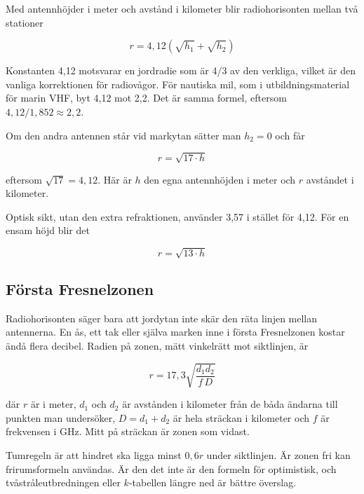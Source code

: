 Med antennhöjder i meter och avstånd i kilometer blir radiohorisonten
mellan två stationer

\begin{equation}
	r = 4,12 \left(\sqrt{h_1}+\sqrt{h_2}\right)
\end{equation}

Konstanten 4,12 motsvarar en jordradie som är 4/3 av den verkliga, vilket
är den vanliga korrektionen för radiovågor. För nautiska mil, som i
utbildningsmaterial för marin VHF, byt 4,12 mot 2,2. Det är samma formel,
eftersom $4,12 / 1,852 \approx 2,2$.

Om den andra antennen står vid markytan sätter man $h_2 = 0$ och får

\begin{equation}
	r = \sqrt{17 \cdot h}
\end{equation}

eftersom $\sqrt{17} = 4,12$. Här är $h$ den egna antennhöjden i meter och
$r$ avståndet i kilometer.

Optisk sikt, utan den extra refraktionen, använder 3,57 i stället för
4,12. För en ensam höjd blir det

\begin{equation}
	r = \sqrt{13 \cdot h}
\end{equation}


\subsection{Första Fresnelzonen}

Radiohorisonten säger bara att jordytan inte skär den räta linjen mellan
antennerna. En ås, ett tak eller själva marken inne i första Fresnelzonen
kostar ändå flera decibel. Radien på zonen, mätt vinkelrätt mot
siktlinjen, är

\begin{equation}
	r = 17,3 \sqrt{\frac{d_1 d_2}{f\,D}}
\end{equation}

där $r$ är i meter, $d_1$ och $d_2$ är avstånden i kilometer från de båda
ändarna till punkten man undersöker, $D = d_1 + d_2$ är hela sträckan i
kilometer och $f$ är frekvensen i GHz. Mitt på sträckan är zonen som
vidast.

Tumregeln är att hindret ska ligga minst $0,6r$ under siktlinjen. Är
zonen fri kan frirumsformeln användas. Är den det inte är den formeln för
optimistisk, och tvåstråleutbredningen eller $k$-tabellen längre ned är
bättre överslag.


